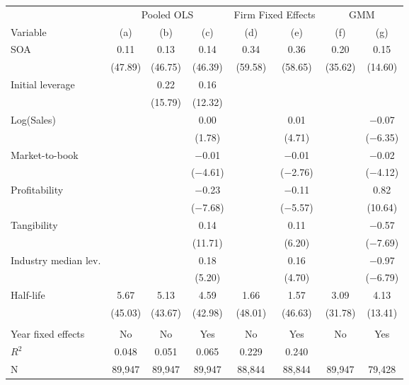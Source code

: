 \begin{tabular}{l*{7}{c}}
\toprule
 & \multicolumn{3}{c}{Pooled OLS} & \multicolumn{2}{c}{Firm Fixed Effects} & \multicolumn{2}{c}{GMM} \\ \cmidrule(lr){2-4} \cmidrule(lr){5-6} \cmidrule(lr){7-8}
Variable & (a) & (b) & (c) & (d) & (e) & (f) & (g) \\ \midrule
SOA         &        0.11&        0.13&        0.14&        0.34&        0.36&        0.20&        0.15\\
            &     (47.89)&     (46.75)&     (46.39)&     (59.58)&     (58.65)&     (35.62)&     (14.60)\\
\addlinespace
Initial leverage&            &        0.22&        0.16&            &            &            &            \\
            &            &     (15.79)&     (12.32)&            &            &            &            \\
\addlinespace
Log(Sales)  &            &            &        0.00&            &        0.01&            &     $-$0.07\\
            &            &            &      (1.78)&            &      (4.71)&            &   ($-$6.35)\\
\addlinespace
Market-to-book&            &            &     $-$0.01&            &     $-$0.01&            &     $-$0.02\\
            &            &            &   ($-$4.61)&            &   ($-$2.76)&            &   ($-$4.12)\\
\addlinespace
Profitability&            &            &     $-$0.23&            &     $-$0.11&            &        0.82\\
            &            &            &   ($-$7.68)&            &   ($-$5.57)&            &     (10.64)\\
\addlinespace
Tangibility &            &            &        0.14&            &        0.11&            &     $-$0.57\\
            &            &            &     (11.71)&            &      (6.20)&            &   ($-$7.69)\\
\addlinespace
Industry median lev.&            &            &        0.18&            &        0.16&            &     $-$0.97\\
            &            &            &      (5.20)&            &      (4.70)&            &   ($-$6.79)\\
\addlinespace
Half-life   &        5.67&        5.13&        4.59&        1.66&        1.57&        3.09&        4.13\\
            &     (45.03)&     (43.67)&     (42.98)&     (48.01)&     (46.63)&     (31.78)&     (13.41)\\
\\
Year fixed effects&          No&          No&         Yes&          No&         Yes&          No&         Yes\\
$ R^{2}$    &       0.048&       0.051&       0.065&       0.229&       0.240&            &            \\
N           &      89,947&      89,947&      89,947&      88,844&      88,844&      89,947&      79,428\\
\bottomrule
\end{tabular}
